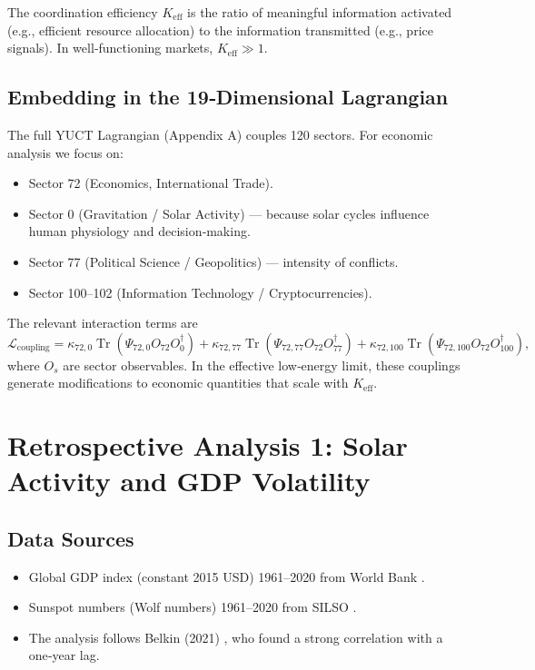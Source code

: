 \documentclass[11pt,a4paper]{article}
\newcommand{\Keff}{K_{\mathrm{eff}}}
\theoremstyle{remark}
\DeclareMathOperator{\Tr}{Tr}
\begin{document}
	The coordination efficiency $\Keff$ is the ratio of meaningful information activated (e.g., efficient resource allocation) to the information transmitted (e.g., price signals). In well‑functioning markets, $\Keff \gg 1$.
	
	\subsection{Embedding in the 19‑Dimensional Lagrangian}
	
	The full YUCT Lagrangian (Appendix A) couples 120 sectors. For economic analysis we focus on:
	\begin{itemize}
		\item Sector 72 (Economics, International Trade).
		\item Sector 0 (Gravitation / Solar Activity) — because solar cycles influence human physiology and decision‑making.
		\item Sector 77 (Political Science / Geopolitics) — intensity of conflicts.
		\item Sector 100–102 (Information Technology / Cryptocurrencies).
	\end{itemize}
	
	The relevant interaction terms are
	\begin{equation}
		\mathcal{L}_{\text{coupling}} = \kappa_{72,0} \Tr(\Psi_{72,0} O_{72} O_0^\dagger) + \kappa_{72,77} \Tr(\Psi_{72,77} O_{72} O_{77}^\dagger) + \kappa_{72,100} \Tr(\Psi_{72,100} O_{72} O_{100}^\dagger),
		\label{eq:couplings}
	\end{equation}
	where $O_s$ are sector observables. In the effective low‑energy limit, these couplings generate modifications to economic quantities that scale with $\Keff$.
	
	\section{Retrospective Analysis 1: Solar Activity and GDP Volatility}
	\label{sec:solar}
	
	\subsection{Data Sources}
	\begin{itemize}
		\item Global GDP index (constant 2015 USD) 1961–2020 from World Bank \cite{WorldBank}.
		\item Sunspot numbers (Wolf numbers) 1961–2020 from SILSO \cite{SILSO}.
		\item The analysis follows Belkin (2021) \cite{Belkin2021}, who found a strong correlation with a one‑year lag.
	\end{itemize}
	
\end{document}
